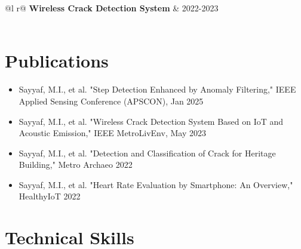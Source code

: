 \documentclass[a4paper,12pt]{article}
\begin{document}
\begin{tabularx}{\linewidth}{ @{}l r@{} }
\textbf{Wireless Crack Detection System} & \hfill 2022-2023 \\
\\
\end{tabularx}


\section{Publications}

\begin{itemize}[nosep,after=\strut, leftmargin=1em, itemsep=3pt]
\item Sayyaf, M.I., et al. "Step Detection Enhanced by Anomaly Filtering," IEEE Applied Sensing Conference (APSCON), Jan 2025
\item Sayyaf, M.I., et al. "Wireless Crack Detection System Based on IoT and Acoustic Emission," IEEE MetroLivEnv, May 2023
\item Sayyaf, M.I., et al. "Detection and Classification of Crack for Heritage Building," Metro Archaeo 2022
\item Sayyaf, M.I., et al. "Heart Rate Evaluation by Smartphone: An Overview," HealthyIoT 2022
\end{itemize}


\section{Technical Skills}
\end{document}
